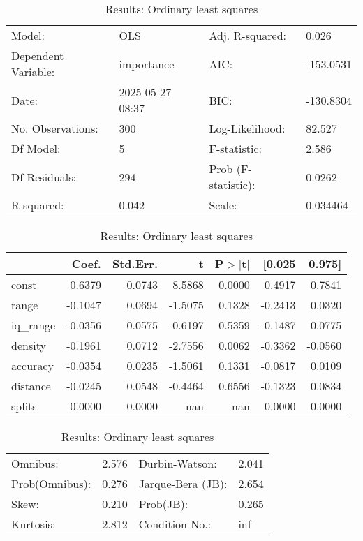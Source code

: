 \begin{table}
\caption{Results: Ordinary least squares}
\label{}
\begin{center}
\begin{tabular}{llll}
\hline
Model:              & OLS              & Adj. R-squared:     & 0.026      \\
Dependent Variable: & importance       & AIC:                & -153.0531  \\
Date:               & 2025-05-27 08:37 & BIC:                & -130.8304  \\
No. Observations:   & 300              & Log-Likelihood:     & 82.527     \\
Df Model:           & 5                & F-statistic:        & 2.586      \\
Df Residuals:       & 294              & Prob (F-statistic): & 0.0262     \\
R-squared:          & 0.042            & Scale:              & 0.034464   \\
\hline
\end{tabular}
\end{center}

\begin{center}
\begin{tabular}{lrrrrrr}
\hline
          &   Coef. & Std.Err. &       t & P$> |$t$|$ &  [0.025 &  0.975]  \\
\hline
const     &  0.6379 &   0.0743 &  8.5868 &      0.0000 &  0.4917 &  0.7841  \\
range     & -0.1047 &   0.0694 & -1.5075 &      0.1328 & -0.2413 &  0.0320  \\
iq\_range & -0.0356 &   0.0575 & -0.6197 &      0.5359 & -0.1487 &  0.0775  \\
density   & -0.1961 &   0.0712 & -2.7556 &      0.0062 & -0.3362 & -0.0560  \\
accuracy  & -0.0354 &   0.0235 & -1.5061 &      0.1331 & -0.0817 &  0.0109  \\
distance  & -0.0245 &   0.0548 & -0.4464 &      0.6556 & -0.1323 &  0.0834  \\
splits    &  0.0000 &   0.0000 &     nan &         nan &  0.0000 &  0.0000  \\
\hline
\end{tabular}
\end{center}

\begin{center}
\begin{tabular}{llll}
\hline
Omnibus:       & 2.576 & Durbin-Watson:    & 2.041  \\
Prob(Omnibus): & 0.276 & Jarque-Bera (JB): & 2.654  \\
Skew:          & 0.210 & Prob(JB):         & 0.265  \\
Kurtosis:      & 2.812 & Condition No.:    & inf    \\
\hline
\end{tabular}
\end{center}
\end{table}
